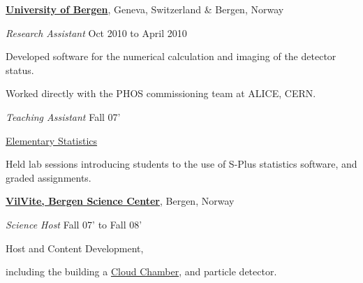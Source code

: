\documentclass[11pt]{article}
\newenvironment{outerlist}[1][\enskip\textbullet]%
        {\begin{itemize}[#1]}{\end{itemize}%
         \vspace{-.6\baselineskip}}
\newenvironment{innerlist}[1][\enskip\textbullet]%
        {\begin{compactitem}[#1]}{\end{compactitem}}
\newcommand{\blankline}{\quad\pagebreak[2]}
\begin{document}
\href{http://www.uib.no/en}{\textbf{University of Bergen}}, 
Geneva, Switzerland \& Bergen, Norway
\begin{outerlist}
\item[] \textit{Research Assistant}
  \hfill Oct 2010 to April 2010
  \begin{innerlist}
  \item Developed software for the numerical calculation and imaging of 
    the detector status.
  \item Worked directly with the PHOS commissioning team at ALICE, CERN.
  \end{innerlist}
\item[] \textit{Teaching Assistant}
  \hfill Fall 07'
  \begin{innerlist}
  \item \href{http://www.uib.no/course/STAT101#course}{Elementary Statistics}
  \item Held lab sessions introducing students to the use of S-Plus statistics 
    software, and graded assignments.
  \end{innerlist}
\end{outerlist}

\blankline

\href{http://www.vilvite.no/english}{\textbf{VilVite, Bergen Science Center}}, 
Bergen, Norway
\begin{outerlist}
\item[] \textit{Science Host}
  \hfill Fall 07' to Fall 08'
  \begin{innerlist}
  \item Host and Content Development,
  \item including the building a \href{http://en.wikipedia.org/wiki/Cloud_chamber}{Cloud Chamber}, and particle detector.
  \end{innerlist}
\end{outerlist}

\blankline

\end{document}
